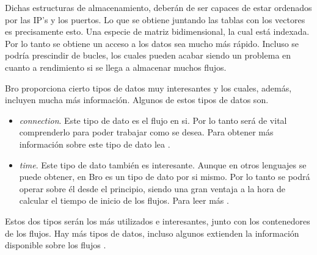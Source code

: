\intro Dichas estructuras de almacenamiento, deberán de ser capaces de estar ordenados por las IP's y los puertos. 
Lo que se obtiene juntando las tablas con los vectores es precisamente esto. Una especie de matriz bidimensional, 
la cual está indexada. Por lo tanto se obtiene un acceso a los datos sea mucho más rápido. Incluso se podría 
prescindir de bucles, los cuales pueden acabar siendo un problema en cuanto a rendimiento si se llega a almacenar 
muchos flujos.

\intro Bro proporciona cierto tipos de datos muy interesantes y los cuales, además, incluyen mucha más información. 
Algunos de estos tipos de datos son. 
\begin{itemize}
\item \textit{connection}. \intro Este tipo de dato es el flujo en si. Por lo tanto será de vital comprenderlo para 
poder trabajar como se desea. Para obtener más información sobre este tipo de dato lea \cite{connectiontype}.
\item \textit{time}. \intro Este tipo de dato también es interesante. Aunque en otros lenguajes se puede obtener, 
en Bro es un tipo de dato por si mismo. Por lo tanto se podrá operar sobre él desde el principio, siendo una gran 
ventaja a la hora de calcular el tiempo de inicio de los flujos. Para leer más \cite{timetype}. 
\end{itemize}

\intro Estos dos tipos serán los más utilizados e interesantes, junto con los contenedores de los flujos. Hay más 
tipos de datos, incluso algunos extienden la información disponible sobre los flujos \cite{conntype}.
